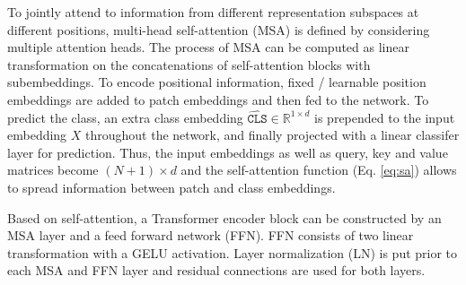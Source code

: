 To jointly attend to information from different representation subspaces at different positions, multi-head self-attention (MSA) is defined by considering multiple attention heads. The process of MSA can be computed as linear transformation on the concatenations of self-attention blocks with subembeddings. To encode positional information, fixed / learnable position embeddings are added to patch embeddings and then fed to the network. To predict the class, an extra class embedding $\hat{\texttt{CLS}} \in \mathbb{R}^{1\times d}$ is prepended to the input embedding $X$ throughout the network, and finally projected with a linear classifer layer for prediction. Thus, the input embeddings as well as query, key and value matrices become $(N+1)\times d$ and the self-attention function (Eq. \ref{eq:sa}) allows to spread information between patch and class embeddings. 

Based on self-attention, a Transformer encoder block can be constructed by an MSA layer and a feed forward network (FFN). FFN consists of two linear transformation with a GELU activation. Layer normalization (LN) is put prior to each MSA and FFN layer and residual connections are used for both layers.


